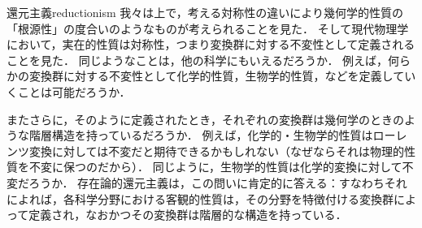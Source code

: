 \documentclass[11pt,a4paper]{jsarticle}
\begin{document}
\begin{rei}{還元主義}{reductionism}
我々は上で，考える対称性の違いにより幾何学的性質の「根源性」の度合いのようなものが考えられることを見た．
そして現代物理学において，実在的性質は対称性，つまり変換群に対する不変性として定義されることを見た．
同じようなことは，他の科学にもいえるだろうか．
例えば，何らかの変換群に対する不変性として化学的性質，生物学的性質，などを定義していくことは可能だろうか．

またさらに，そのように定義されたとき，それぞれの変換群は幾何学のときのような階層構造を持っているだろうか．
例えば，化学的・生物学的性質はローレンツ変換に対しては不変だと期待できるかもしれない（なぜならそれは物理的性質を不変に保つのだから）．
同じように，生物学的性質は化学的変換に対して不変だろうか．
存在論的還元主義は，この問いに肯定的に答える：すなわちそれによれば，各科学分野における客観的性質は，その分野を特徴付ける変換群によって定義され，なおかつその変換群は階層的な構造を持っている．
\end{rei}






\end{document}
